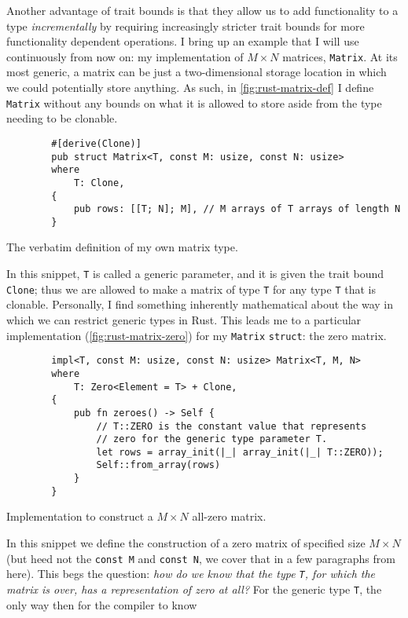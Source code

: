 \documentclass{report}
\newenvironment{code}{\captionsetup{type=listing}}{}
\begin{document}
Another advantage of trait bounds is that they allow us to add functionality to
a type \emph{incrementally} by requiring increasingly stricter trait bounds for
more functionality dependent operations. I bring up an example that I will use
continuously from now on: my implementation of $M\times N$ matrices,
\verb+Matrix+.
At its most generic, a matrix can be just a two-dimensional storage location
in which we could potentially store anything. As such, in
\cref{fig:rust-matrix-def} I define \Verb+Matrix+ without any bounds on what
it is allowed to store aside from the type needing to be clonable.
\begin{code}
    \begin{verbatim}
        #[derive(Clone)]
        pub struct Matrix<T, const M: usize, const N: usize>
        where
            T: Clone,
        {
            pub rows: [[T; N]; M], // M arrays of T arrays of length N
        }
    \end{verbatim}
    \caption{The verbatim definition of my own matrix type.}
    \label{fig:rust-matrix-def}
\end{code}
\noindent
In this snippet, \Verb+T+ is called a generic parameter, and it is given the
trait bound \Verb+Clone+; thus we are allowed to make a matrix of type \Verb+T+
for any type \Verb+T+ that is clonable. Personally, I find something inherently
mathematical about the way in which we can restrict generic types in Rust. This
leads me to a particular implementation (\cref{fig:rust-matrix-zero}) for my
\Verb+Matrix+ \Verb+struct+: the zero matrix.
\begin{code}
    \begin{verbatim}
        impl<T, const M: usize, const N: usize> Matrix<T, M, N>
        where
            T: Zero<Element = T> + Clone,
        {
            pub fn zeroes() -> Self {
                // T::ZERO is the constant value that represents
                // zero for the generic type parameter T.
                let rows = array_init(|_| array_init(|_| T::ZERO));
                Self::from_array(rows)
            }
        }
    \end{verbatim}
    \caption{Implementation to construct a $M\times N$ all-zero matrix.}
    \label{fig:rust-matrix-zero}
\end{code}
\noindent
In this snippet we define the construction of a zero matrix of specified size
$M\times N$ (but heed not the \Verb+const M+ and \Verb+const N+, we cover that
in a few paragraphs from here). This begs the question: \emph{how do we know
that the type \Verb+T+, for which the matrix is over, has a representation of zero at
all?} For the generic type \Verb+T+, the only way then for the compiler to know
\end{document}
